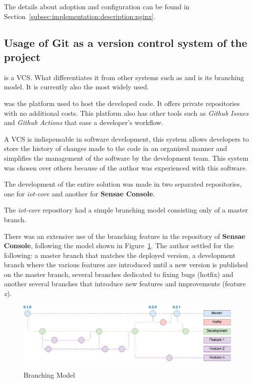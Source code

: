 The details about  adoption and configuration can be found in Section~\ref{subsec:implementation:description:nginx}.

\subsection{Usage of Git as a version control system of the project}
\label{subsec:implementation:decisions:git}

 is a \gls{VCS}. What differentiates it from other
systems such as  and  is its branching model. It is currently also the most widely used.

 was the platform used to host the developed code. It offers private repositories with no additional costs. This platform also has other tools such as \textit{Github Issues} and \textit{Github Actions} that ease a developer's workflow.

A \gls{VCS} is indispensable in software development, this system allows developers to store the history of changes made to the code in an organized manner and simplifies the management of the software by the development team. This system was chosen over others because of the author was experienced with this software.

The development of the entire solution was made in two separated repositories, one for \textit{iot-core} and another for \textbf{Sensae Console}.

The \textit{iot-core} repository had a simple branching model consisting only of a master branch.

There was an extensive use of the branching feature in the repository of \textbf{Sensae Console}, following the model shown in Figure~\ref{fig:implementation:decisions:git:branch}. The author settled for the following: a master branch that matches the deployed version, a development branch where the various features are introduced until a new version is published on the master branch, several branches dedicated to fixing bugs (hotfix) and another several branches that introduce new features and improvements (feature \textit{x}).

\begin{figure}[H]
    \centering
    \resizebox{\columnwidth}{!}
    {
       \includegraphics{assets/figures/branching-model.png}
    }
    \caption[Branching Model]{Branching Model}
    \label{fig:implementation:decisions:git:branch}
\end{figure}

